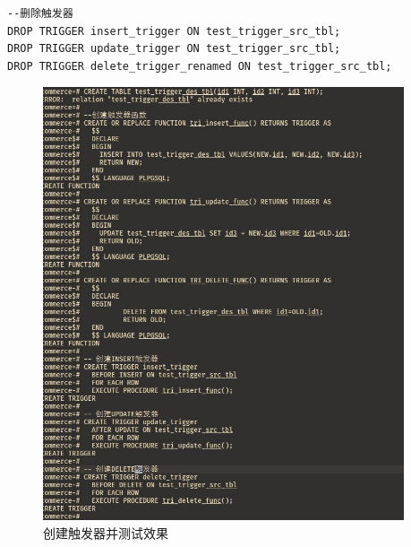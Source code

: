 \begin{enumerate}
\begin{center}
\begin{verbatim}
--删除触发器
DROP TRIGGER insert_trigger ON test_trigger_src_tbl;
DROP TRIGGER update_trigger ON test_trigger_src_tbl;
DROP TRIGGER delete_trigger_renamed ON test_trigger_src_tbl;
\end{verbatim}
\end{center}
\begin{figure}[H]
  \begin{center}
    \includegraphics[width=0.95\textwidth]{./figures/trigger0.jpg}
  \end{center}
  \caption{创建触发器并测试效果}
\end{figure}
\begin{figure}[H]
  \begin{center}

\end{center}
\end{figure}
\end{enumerate}
